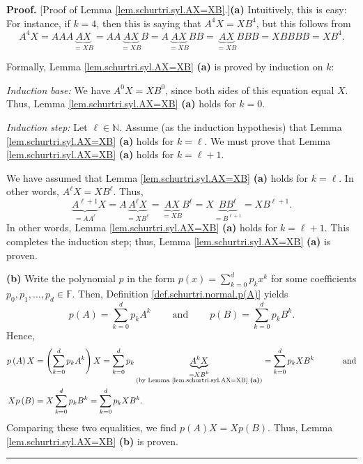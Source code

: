 \documentclass[numbers=enddot,12pt,final,onecolumn,notitlepage]{scrartcl}%
\numberwithin{exer}{subsection}
\theoremstyle{definition}
\newenvironment{proof}[1][Proof]{\noindent\textbf{#1.} }{\ \rule{0.5em}{0.5em}}
\let\sumnonlimits\sum
\renewcommand{\sum}{\sumnonlimits\limits}
\begin{document}
\begin{proof}
[Proof of Lemma \ref{lem.schurtri.syl.AX=XB}.]\textbf{(a)} Intuitively, this
is easy: For instance, if $k=4$, then this is saying that $A^{4}X=XB^{4}$, but
this follows from
\[
A^{4}X=AAA\underbrace{AX}_{=XB}=AA\underbrace{AX}_{=XB}B=A\underbrace{AX}%
_{=XB}BB=\underbrace{AX}_{=XB}BBB=XBBBB=XB^{4}.
\]


Formally, Lemma \ref{lem.schurtri.syl.AX=XB} \textbf{(a)} is proved by
induction on $k$:

\textit{Induction base:} We have $A^{0}X=XB^{0}$, since both sides of this
equation equal $X$. Thus, Lemma \ref{lem.schurtri.syl.AX=XB} \textbf{(a)}
holds for $k=0$.

\textit{Induction step:} Let $\ell\in\mathbb{N}$. Assume (as the induction
hypothesis) that Lemma \ref{lem.schurtri.syl.AX=XB} \textbf{(a)} holds for
$k=\ell$. We must prove that Lemma \ref{lem.schurtri.syl.AX=XB} \textbf{(a)}
holds for $k=\ell+1$.

We have assumed that Lemma \ref{lem.schurtri.syl.AX=XB} \textbf{(a)} holds for
$k=\ell$. In other words, $A^{\ell}X=XB^{\ell}$. Thus,%
\[
\underbrace{A^{\ell+1}}_{=AA^{\ell}}X=A\underbrace{A^{\ell}X}_{=XB^{\ell}%
}=\underbrace{AX}_{=XB}B^{\ell}=X\underbrace{BB^{\ell}}_{=B^{\ell+1}}%
=XB^{\ell+1}.
\]
In other words, Lemma \ref{lem.schurtri.syl.AX=XB} \textbf{(a)} holds for
$k=\ell+1$. This completes the induction step; thus, Lemma
\ref{lem.schurtri.syl.AX=XB} \textbf{(a)} is proven. \medskip

\textbf{(b)} Write the polynomial $p$ in the form $p\left(  x\right)
=\sum_{k=0}^{d}p_{k}x^{k}$ for some coefficients $p_{0},p_{1},\ldots,p_{d}%
\in\mathbb{F}$. Then, Definition \ref{def.schurtri.normal.p(A)} yields%
\[
p\left(  A\right)  =\sum_{k=0}^{d}p_{k}A^{k}\ \ \ \ \ \ \ \ \ \ \text{and}%
\ \ \ \ \ \ \ \ \ \ p\left(  B\right)  =\sum_{k=0}^{d}p_{k}B^{k}.
\]
Hence,%
\begin{align*}
p\left(  A\right)  X  &  =\left(  \sum_{k=0}^{d}p_{k}A^{k}\right)
X=\sum_{k=0}^{d}p_{k}\underbrace{A^{k}X}_{\substack{=XB^{k}\\\text{(by Lemma
\ref{lem.schurtri.syl.AX=XB} \textbf{(a)})}}}=\sum_{k=0}^{d}p_{k}%
XB^{k}\ \ \ \ \ \ \ \ \ \ \text{and}\\
Xp\left(  B\right)   &  =X\sum_{k=0}^{d}p_{k}B^{k}=\sum_{k=0}^{d}p_{k}XB^{k}.
\end{align*}
Comparing these two equalities, we find $p\left(  A\right)  X=Xp\left(
B\right)  $. Thus, Lemma \ref{lem.schurtri.syl.AX=XB} \textbf{(b)} is proven.
\end{proof}
\end{document}
